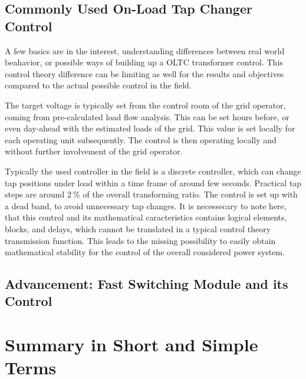 \subsection{Commonly Used On-Load Tap Changer Control}

A few basics are in the interest, understanding differences between real world beahavior, or possible ways of building up a \acs{OLTC} transformer control. 
This control theory difference can be limiting as well for the results and objectives compared to the actual possible control in the field.

The target voltage is typically set from the control room of the grid operator, coming from pre-calculated load flow analysis. 
This can be set hours before, or even day-ahead with the estimated loads of the grid. 
This value is set locally for each operating unit subsequently. 
The control is then operating locally and without further involvement of the grid operator. \quelle

Typically the used controller in the field is a discrete controller, which can change tap positions under load within a time frame of around few seconds. 
Practical tap steps are around $2~\mathrm{\%}$ of the overall transforming ratio. 
The control is set up with a dead band, to avoid unnecessary tap changes. 
It is necessecary to note here, that this control and its mathematical caracteristics contains logical elements, blocks, and delays, which cannot be translated in a typical control theory transmission function. 
This leads to the missing possibility to easily obtain mathematical stability for the control of the overall considered power system. \quelle

\subsection{Advancement: Fast Switching Module and its Control}



\section{Summary in Short and Simple Terms}